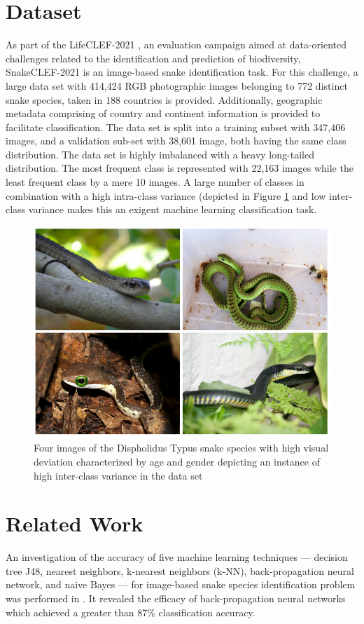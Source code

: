 \documentclass[
]{ceurart}
\begin{document}
\section{Dataset}

 As part of the LifeCLEF-2021 \cite{lifeclef2021}, an evaluation campaign aimed at data-oriented challenges related to the identification and prediction of biodiversity, SnakeCLEF-2021 \cite{snakeclef2021} is an image-based snake identification task. For this challenge, a large data set with 414,424 RGB photographic images belonging to 772 distinct snake species, taken in 188 countries is provided. Additionally, geographic metadata comprising of country and continent information is provided to facilitate classification. The data set is split into a training subset with 347,406 images, and a validation sub-set with 38,601 image, both having the same class distribution. The data set is highly imbalanced with a heavy long-tailed distribution. The most frequent class is represented with 22,163 images while the least frequent class by a mere 10 images. A large number of classes in combination with a high intra-class variance (depicted in Figure \ref{fig2_intraclass_var} and low inter-class variance makes this an exigent machine learning classification task.

\begin{figure}[!hbt]
  \centering
  \includegraphics[width=0.59\columnwidth]{IntraClassVar}
  \caption{Four images of the Dispholidus Typus snake species with high visual deviation characterized by age and gender depicting an instance of high inter-class variance in the data set}
  \label{fig2_intraclass_var}
\end{figure}


\section{Related Work}

An investigation of the accuracy of five machine learning techniques — decision tree J48, nearest neighbors, k-nearest neighbors (k-NN), back-propagation neural network, and naive Bayes — for image-based snake species identification problem was performed in \cite{amir}. It revealed the efficacy of back-propagation neural networks which achieved a greater than 87\% classification accuracy. 
\end{document}
